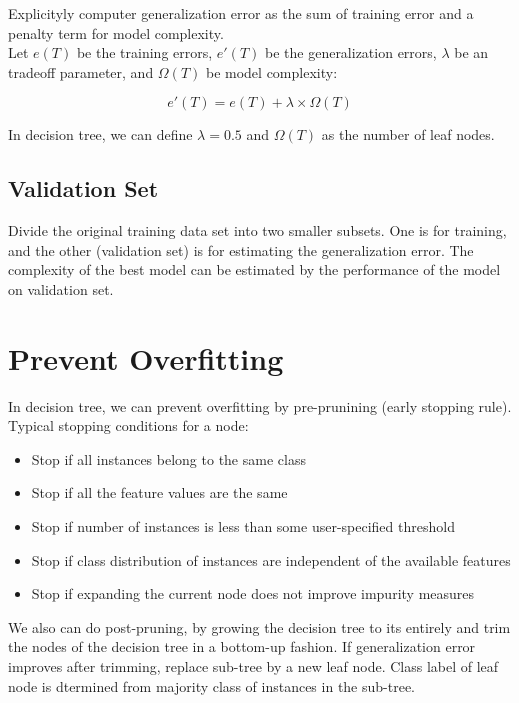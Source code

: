 \begin{multicols*}{2}
\noindent Explicityly computer generalization error as the sum of training error and a penalty term for model complexity. \\

\noindent Let $e(T)$ be the training errors, $e'(T)$ be the generalization errors, $\lambda$ be an tradeoff parameter, and $\Omega(T)$ be model complexity:

$$e'(T)=e(T) + \lambda \times \Omega(T)$$

\noindent In decision tree, we can define $\lambda=0.5$ and $\Omega(T)$ as the number of leaf nodes. 

\subsection{Validation Set}

Divide the original training data set into two smaller subsets. One is for training, and the other (validation set) is for estimating the generalization error. The complexity of the best model can be estimated by the performance of the model on validation set. 

\section{Prevent Overfitting}

\noindent In decision tree, we can prevent overfitting by pre-prunining (early stopping rule). Typical stopping conditions for a node:

\begin{itemize}
    \item Stop if all instances belong to the same class
    \item Stop if all the feature values are the same
    \item Stop if number of instances is less than some user-specified threshold
    \item Stop if class distribution of instances are independent of the available features
    \item Stop if expanding the current node does not improve impurity measures
\end{itemize}

\noindent We also can do post-pruning, by growing the decision tree to its entirely and trim the nodes of the decision tree in a bottom-up fashion. If generalization error improves after trimming, replace sub-tree by a new leaf node. Class label of leaf node is dtermined from majority class of instances in the sub-tree. 


\end{multicols*}
